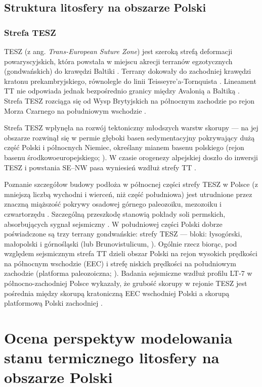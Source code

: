 \documentclass[11.5pt,twoside]{report}
\renewcommand{\headrulewidth}{0pt}}
\begin{document}

\section{Struktura litosfery na obszarze Polski}

\subsection{Strefa TESZ}
TESZ (z ang. \textit{Trans-European Suture Zone}) jest szeroką strefą deformacji powaryscyjskich, która powstała w miejscu akrecji terranów egzotycznych (gondwańskich) do krawędzi Baltiki \parencite{Belka.2002,Guterch.1998}. Terrany dokowały do zachodniej krawędzi kratonu prekambryjskiego, równolegle do linii Teisseyre'a-Tornquista \parencite{Belka.2002}. Lineament TT nie odpowiada jednak bezpośrednio granicy między Avalonią a Baltiką \parencite{Mizerski.2017,Mazur.2015}. Strefa TESZ rozciąga się od Wysp Brytyjskich na północnym zachodzie po rejon Morza Czarnego na południowym wschodzie \parencite{Guterch.1998}. 

Strefa TESZ wpłynęła na rozwój tektoniczny młodszych warstw skorupy --- na jej obszarze rozwinął się w permie głęboki basen sedymentacyjny pokrywający dużą część Polski i północnych Niemiec, określany mianem basenu polskiego (rejon basenu środkowoeuropejskiego; \cite{Guterch.1998}). W czasie orogenezy alpejskiej doszło do inwersji TESZ i powstania SE--NW pasa wyniesień wzdłuż strefy TT \parencite{Guterch.1998}.

Poznanie szczegółow budowy podłoża w północnej części strefy TESZ w Polsce (z mniejszą liczbą wychodni i wierceń, niż część południowa) jest utrudnione przez znaczną miąższość pokrywy osadowej górnego paleozoiku, mezozoiku i czwartorzędu \parencite{Belka.2002}. Szczególną przeszkodę stanowią pokłady soli permskich, absorbujących sygnał sejsmiczny \parencite{Guterch.1998}. W południowej części Polski dobrze poświadczone są trzy terrany gondwańskie: strefy TESZ --- bloki: łysogórski, małopolski i górnośląski (lub Brunovistulicum, \cite{Bula.2008,Belka.2002}). Ogólnie rzecz biorąc, pod względem sejsmicznym strefa TT dzieli obszar Polski na rejon wysokich prędkości na północnym wschodzie (EEC) i strefę niskich prędkości na południowym zachodzie (platforma paleozoiczna; \cite{Guterch.1998}). Badania sejsmiczne wzdłuż profilu LT-7 w północno-zachodniej Polsce wykazały, że grubość skorupy w rejonie TESZ jest pośrednia między skorupą kratoniczną EEC wschodniej Polski a skorupą platformową Polski zachodniej \parencite{Guterch.1994}. 

\chapter{Ocena perspektyw modelowania stanu termicznego litosfery na obszarze Polski}

\renewcommand\headrulewidth{0pt} %
{\renewcommand{\markboth}[2]{} %
	\printbibliography[heading=bibintoc,title=Bibliografia]} %
\end{document}
